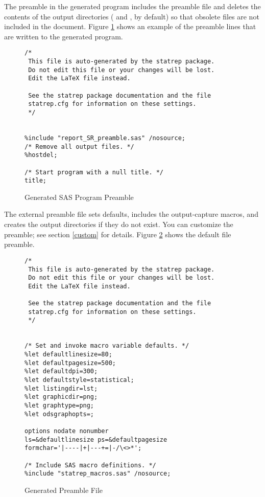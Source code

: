 \documentclass[article,oneside]{memoir}
\begin{document}
The preamble in the generated program includes the preamble file and deletes the contents of the
output directories ( and   , by default) so that obsolete files are
not included in the document.
Figure \ref{fig:pgmpreamble} shows an example of the preamble lines
that are written to the generated program.
\begin{figure}[H]
\begin{snugshade}
\begin{verbatim}
/*
 This file is auto-generated by the statrep package.
 Do not edit this file or your changes will be lost.
 Edit the LaTeX file instead.

 See the statrep package documentation and the file
 statrep.cfg for information on these settings.
 */


%include "report_SR_preamble.sas" /nosource;
/* Remove all output files. */
%hostdel;

/* Start program with a null title. */
title;
\end{verbatim}
\end{snugshade}
\caption{Generated SAS Program Preamble}\label{fig:pgmpreamble}
\end{figure}

  The external preamble file sets defaults, includes
  the output-capture macros, and creates the output directories if they do not exist.
  You can customize the preamble; see section \ref{custom} for details.
  Figure \ref{fig:preamble} shows the default file preamble.
\begin{figure}[H]
\begin{snugshade}
\begin{verbatim}
/*
 This file is auto-generated by the statrep package.
 Do not edit this file or your changes will be lost.
 Edit the LaTeX file instead.

 See the statrep package documentation and the file
 statrep.cfg for information on these settings.
 */


/* Set and invoke macro variable defaults. */
%let defaultlinesize=80;
%let defaultpagesize=500;
%let defaultdpi=300;
%let defaultstyle=statistical;
%let listingdir=lst;
%let graphicdir=png;
%let graphtype=png;
%let odsgraphopts=;

options nodate nonumber
ls=&defaultlinesize ps=&defaultpagesize
formchar='|----|+|---+=|-/\<>*';

/* Include SAS macro definitions. */
%include "statrep_macros.sas" /nosource;
\end{verbatim}
\end{snugshade}
\caption{Generated Preamble File}\label{fig:preamble}
\end{figure}
\end{document}
